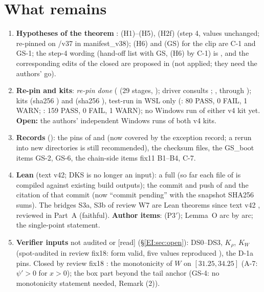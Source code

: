 \documentclass[11pt]{article}
\begin{document}
\section{What remains}\label{M:sec:remains}
\begin{enumerate}[leftmargin=*]
\item \textbf{Hypotheses of the theorem} \tH: (H1)--(H5), (H2f) (step 4, values unchanged; re-pinned on /v37 in manifest\_v38); (H6) and (GS) for the clip are C-1 and GS-1; the step-4 wording (hand-off list with GS, (H6) by C-1) is , and the corresponding edits of the closed  are proposed in  (not applied; they need the authors' go).
\item \textbf{Re-pin and kits}: \emph{re-pin done} ( (29 stages, ); driver  consults ; ,  through ); kits  (sha256 ) and  (sha256 ), test-run in WSL only (: 80 PASS, 0 FAIL, 1 WARN; : 159 PASS, 0 FAIL, 1 WARN); no Windows run of either v4 kit yet. \textbf{Open:} the authors' independent Windows runs of both v4 kits.
\item \textbf{Records} (): the pins of  and  (now covered by the exception record; a rerun into new directories is still recommended), the checksum files, the GS\_boot items GS-2, GS-6, the chain-side items fix11 B1--B4, C-7.
\item \textbf{Lean} (text v42; DKS is no longer an input): a full  (so far each file of  is compiled against existing build outputs); the commit and push of  and the citation of that commit (now ``commit pending'' with the snapshot SHA256 sums). The bridges S3a, S3b of review W7 are Lean theorems since text v42 \LeanSthree, reviewed in  Part~A (faithful). \textbf{Author items}: (P3$'$); Lemma~O arc by arc; the single-point statement.
\item \textbf{Verifier inputs} not audited or [read] (\S\ref{EI:sec:open}): DS0--DS3, $K_\rho$, $K_W$ (spot-audited in review fix18: form valid, five values reproduced \tHd), the D-1a pins. Closed by review fix18 \tHd: the monotonicity of $W$ on $[31.25,34.25]$ (A-7: $\psi'>0$ for $x>0$); the box part beyond the tail anchor (GS-4: no monotonicity statement needed,  Remark (2)).

\end{enumerate}
\end{document}
